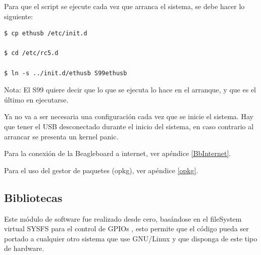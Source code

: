 \bigskip
Para que el script se ejecute cada vez que arranca el sistema, se debe hacer lo siguiente:

\bigskip
\begin{verbatim}
$ cp ethusb /etc/init.d

$ cd /etc/rc5.d

$ ln -s ../init.d/ethusb S99ethusb
\end{verbatim}

Nota: El S99 quiere decir que lo que se ejecuta lo hace en el arranque, y que es el último en ejecutarse.

\bigskip
Ya no va a ser necesaria una configuración cada vez que se inicie el sistema. 
Hay que tener el USB desconectado durante el inicio del sistema, en caso contrario al arrancar se presenta un kernel panic.

Para la conexión de la Beagleboard a internet, ver apéndice \ref{BbInternet}. 

Para el uso del gestor de paquetes (opkg), ver apéndice \ref{opkg}. 


\subsection{Bibliotecas}


Este módulo de software fue realizado desde cero, basándose en el fileSystem virtual SYSFS para el control de GPIOs \cite{gpio} \cite{gpioK}, esto permite que el código pueda ser portado a cualquier otro sistema que use GNU/Linux y que disponga de este tipo de hardware.

